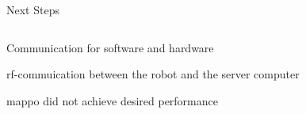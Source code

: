 
\begin{frame}{Next Steps}

    \begin{columns}[T]
        \begin{column}{0.9\textwidth}
        
            Communication for software and hardware

            \ac{rf}-commuication between the robot and the server computer
            
            \vspace{1em}

            \acf{mappo} did not achieve desired performance

        \end{column}
        \begin{column}{0.1\textwidth}

        
        \end{column}
    \end{columns}
          
\end{frame}

